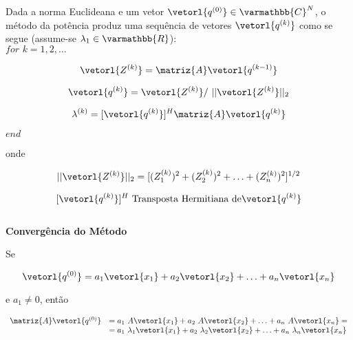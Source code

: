 Dada a norma Euclideana e um vetor $ \vetorl{q^{(0)}} \in \varmathbb{C}^N $, o método da potência produz uma sequência de vetores $ \vetorl{q^{(k)}} $ como se segue (assume-se $ \lambda_1 \in \varmathbb{R} $):\\

\hspace*{3cm}
$
 for \, \, k = 1, 2, \ldots
$

\begin{equation}
 \label{cap5:sec4:eq4}
 \vetorl{Z^{(k)}} = \matriz{A} \vetorl{q^{(k-1)}}
\end{equation}

\begin{equation}
 \label{cap5:sec4:eq5}
 \vetorl{q^{(k)}} = \vetorl{Z^{(k)}} / \, \, ||\vetorl{Z^{(k)}}||_2
\end{equation}

\begin{equation}
 \label{cap5:sec4:eq6}
 \lambda^{(k)} = [\vetorl{q^{(k)}}]^H \matriz{A} \vetorl{q^{(k)}}
\end{equation}

\hspace*{3cm}
$
 end
$

onde

\begin{equation}
 \label{cap5:sec4:eq7}
 || \vetorl{Z^{(k)}} ||_2 = [ (Z_1^{(k)})^2 + (Z_2^{(k)})^2 + \ldots + (Z_n^{(k)})^2 ]^{1/2}
\end{equation}

\begin{equation}
 \label{cap5:sec4:eq8}
 [\vetorl{q^{(k)}}]^H \, \, \mbox{Transposta Hermitiana de} \vetorl{q^{(k)}}
\end{equation}\\

\textbf{Convergência do Método}

Se

\begin{equation}
 \label{cap5:sec4:eq9}
 \vetorl{q^{(0)}} = a_1 \vetorl{x_1} + a_2 \vetorl{x_2} + \ldots + a_n \vetorl{x_n}
\end{equation}

e $ a_1 \neq 0 $, então

\begin{equation}
 \label{cap5:sec4:eq10}
 \begin{array}{ll}
 \matriz{A} \vetorl{q^{(0)}} & = a_1  \,\, A \vetorl{x_1} + a_2 \, \, A \vetorl{x_2} + \ldots + a_n \, \, A \vetorl{x_n} =\\
                             & = a_1 \, \, \lambda_1 \vetorl{x_1} + a_2 \, \, \lambda_2 \vetorl{x_2} + \ldots + a_n \, \, \lambda_n \vetorl{x_n}
 \end{array}
\end{equation}

